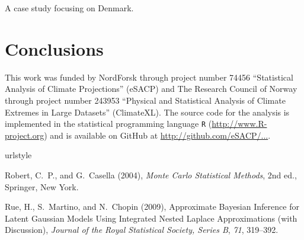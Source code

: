 \documentclass[wrr, draft]{agutex}
\begin{document}
\begin{article}
A case study focusing on Denmark. 

\section{Conclusions}

\begin{acknowledgments}
This work was funded by NordForsk through project number 74456 ``Statistical Analysis of Climate Projections'' (eSACP) and The Research Council of Norway through project number 243953 ``Physical and Statistical Analysis of Climate Extremes in Large Datasets'' (ClimateXL). The source code for the analysis is implemented in the statistical programming language {\tt R} (\url{http://www.R-project.org}) and is available on GitHub at \url{http://github.com/eSACP/...}.
\end{acknowledgments}


% 

\begin{thebibliography}{37}
\providecommand{\natexlab}[1]{#1}
\expandafter\ifx\csname urlstyle\endcsname\relax
  \providecommand{\doi}[1]{doi:\discretionary{}{}{}#1}\else
  \providecommand{\doi}{doi:\discretionary{}{}{}\begingroup
  \urlstyle{rm}\Url}\fi

Robert, C.~P., and G.~Casella (2004), \textit{Monte Carlo Statistical Methods},
  2nd ed., Springer, New York.

Rue, H., S.~Martino, and N.~Chopin (2009), {Approximate {B}ayesian Inference
  for Latent {G}aussian Models Using Integrated Nested {L}aplace Approximations
  (with Discussion)}, \textit{Journal of the Royal Statistical Society, Series
  B}, \textit{71}, 319--392.


\end{thebibliography}

\end{article}

\end{document}
